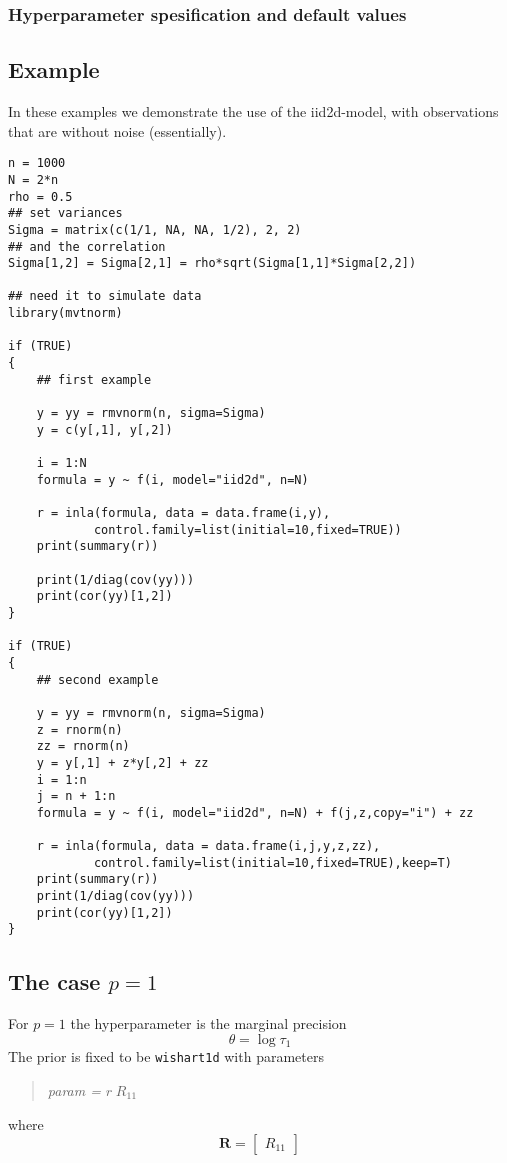 \documentclass[a4paper,11pt]{article}
\begin{document}
\subsubsection*{Hyperparameter spesification and default values}



\subsection*{Example}
In these examples we demonstrate the use of the iid2d-model, with
observations that are without noise (essentially).
\begin{verbatim}
n = 1000
N = 2*n
rho = 0.5
## set variances
Sigma = matrix(c(1/1, NA, NA, 1/2), 2, 2)
## and the correlation
Sigma[1,2] = Sigma[2,1] = rho*sqrt(Sigma[1,1]*Sigma[2,2])

## need it to simulate data
library(mvtnorm)

if (TRUE)
{
    ## first example
    
    y = yy = rmvnorm(n, sigma=Sigma)
    y = c(y[,1], y[,2])

    i = 1:N
    formula = y ~ f(i, model="iid2d", n=N)

    r = inla(formula, data = data.frame(i,y),
            control.family=list(initial=10,fixed=TRUE))
    print(summary(r))

    print(1/diag(cov(yy)))
    print(cor(yy)[1,2])
}

if (TRUE)
{
    ## second example

    y = yy = rmvnorm(n, sigma=Sigma)
    z = rnorm(n)
    zz = rnorm(n)
    y = y[,1] + z*y[,2] + zz
    i = 1:n
    j = n + 1:n
    formula = y ~ f(i, model="iid2d", n=N) + f(j,z,copy="i") + zz 

    r = inla(formula, data = data.frame(i,j,y,z,zz),
            control.family=list(initial=10,fixed=TRUE),keep=T)
    print(summary(r))
    print(1/diag(cov(yy)))
    print(cor(yy)[1,2])
}
\end{verbatim}

\subsection*{The case $p=1$}

For $p=1$ the
hyperparameter is the marginal precision
\begin{displaymath}
    \theta = \log \tau_{1}
\end{displaymath}
The prior is fixed to be \texttt{wishart1d} with parameters
\begin{quote}
    \emph{param = } $r\;R_{11}$
\end{quote}
where
\begin{displaymath}
    \mathbf{R} =
    \left[\begin{array}{c}
        R_{11}
    \end{array}\right]
\end{displaymath}
\end{document}
